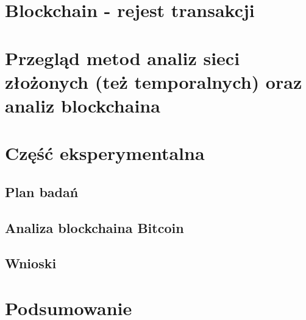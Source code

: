 \documentclass[printmode,oneside]{mgr}
\begin{document}
\chapter{Blockchain - rejest transakcji}


\chapter{Przegląd metod analiz sieci złożonych (też temporalnych) oraz analiz blockchaina}

\chapter{Część eksperymentalna}
\section{Plan badań}
\section{Analiza blockchaina Bitcoin}
\section{Wnioski}


\chapter{Podsumowanie}




\end{document}
